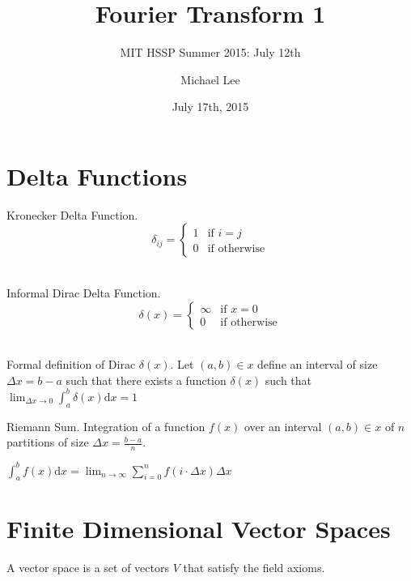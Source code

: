\documentclass[11pt]{article} %
\title{Fourier Transform 1}
\subtitle{MIT HSSP Summer 2015: July 12th}
\author{Michael Lee}
\date{July 17th, 2015} %
\newenvironment{definition}[1][Definition]{\begin{trivlist}
\item[\hskip \labelsep {\bfseries #1}]}{\end{trivlist}}
\begin{document}
\maketitle

\section{Delta Functions}


\begin{definition}
	Kronecker Delta Function. 
	{\center
		\[ \delta_{ij} = \begin{cases} 1 & \text{if } i = j \\ 0 & \text{if otherwise} \end{cases} \] \\
	}
\end{definition}

\begin{definition}
	Informal Dirac Delta Function. 
	{\center
		\[ \delta(x) = \begin{cases} \infty & \text{if } x = 0 \\ 0 & \text{if otherwise} \end{cases} \] \\
	}
\end{definition}

\begin{definition}
	Formal definition of Dirac $\delta(x)$. Let $(a, b) \in x$ define an interval of size $\Delta{x} = b - a $ such that there exists a function $\delta(x)$ such that $\lim_{\Delta{x} \to 0}\int_{a}^{b}\delta(x)\mathrm{d}x = 1$
\end{definition}

\begin{definition}
	Riemann Sum. Integration of a function $f(x)$ over an interval $(a, b) \in x$ of $n$ partitions of size $\Delta{x} = \frac{b - a}{n}$. 
	
	{\center 
		$\int_{a}^{b} f(x) \mathrm{d}x = \lim_{n \to \infty}\sum_{i = 0}^{n} f(i \cdot \Delta{x})\Delta{x}$ 
	}
\end{definition}

\section{Finite Dimensional Vector Spaces}

\begin{definition}
	A vector space is a set of vectors $V$ that satisfy the field axioms. 
\end{definition}
\end{document}
